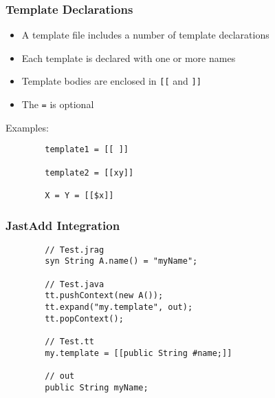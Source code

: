 \documentclass[a4paper,12pt,presentation]{beamer}
\begin{document}
\begin{frame}[fragile]
    \frametitle{Template Declarations}

    \begin{itemize}
        \item A template file includes a number of template declarations
        \item Each template is declared with one or more names
        \item Template bodies are enclosed in \verb'[[' and \verb']]'
        \item The \verb'=' is optional
    \end{itemize}

    Examples:
    \begin{verbatim}
        template1 = [[ ]]

        template2 = [[xy]]

        X = Y = [[$x]]
    \end{verbatim}
\end{frame}

\begin{frame}[fragile]
    \frametitle{JastAdd Integration}

    \begin{verbatim}
        // Test.jrag
        syn String A.name() = "myName";

        // Test.java
        tt.pushContext(new A());
        tt.expand("my.template", out);
        tt.popContext();

        // Test.tt
        my.template = [[public String #name;]]

        // out
        public String myName;
    \end{verbatim}
\end{frame}
\end{document}
